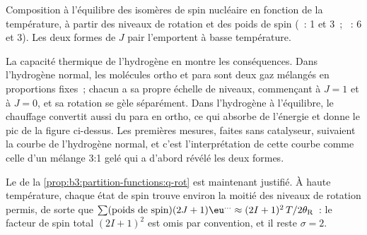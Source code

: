 \begin{omfigure}

{\small Composition à l'équilibre des isomères de spin nucléaire en
fonction de la température, à partir des niveaux de rotation et des
poids de spin (~: 1 et 3~;
~: 6 et 3). Les deux formes de $J$ pair l'emportent à basse
température.}
\end{omfigure}

La capacité thermique de l'hydrogène en montre les conséquences. Dans
l'hydrogène normal, les molécules ortho et para sont deux gaz mélangés
en proportions fixes~; chacun a sa propre échelle de niveaux, commençant
à $J = 1$ et à $J = 0$, et sa rotation se gèle séparément. Dans
l'hydrogène à l'équilibre, le chauffage convertit aussi du para en
ortho, ce qui absorbe de l'énergie et donne le pic de la figure
ci-dessus. Les premières mesures, faites sans catalyseur, suivaient la
courbe de l'hydrogène normal, et c'est l'interprétation de cette courbe
comme celle d'un mélange 3:1 gelé qui a d'abord révélé les deux formes.

\begin{remark}
Le  de la \cref{prop:b3:partition-functions:q-rot} est
maintenant justifié.
À haute température, chaque état de spin trouve environ la moitié des
niveaux de rotation permis, de sorte que
$\sum(\text{poids de spin})(2J+1)\eu^{\dots} \approx (2I+1)^2\,T/2\theta_{\mathrm R}$~:
le facteur de spin total $(2I+1)^2$ est omis par convention, et il reste
$\sigma = 2$.
\end{remark}

